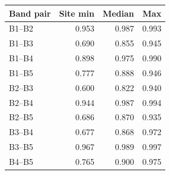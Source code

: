 \begin{tabular}{@{}lrrr@{}}
\toprule
Band pair & Site min & Median & Max\\
\midrule
B1--B2 & 0.953 & 0.987 & 0.993 \\
B1--B3 & 0.690 & 0.855 & 0.945 \\
B1--B4 & 0.898 & 0.975 & 0.990 \\
B1--B5 & 0.777 & 0.888 & 0.946 \\
B2--B3 & 0.600 & 0.822 & 0.940 \\
B2--B4 & 0.944 & 0.987 & 0.994 \\
B2--B5 & 0.686 & 0.870 & 0.935 \\
B3--B4 & 0.677 & 0.868 & 0.972 \\
B3--B5 & 0.967 & 0.989 & 0.997 \\
B4--B5 & 0.765 & 0.900 & 0.975 \\
\bottomrule
\end{tabular}

